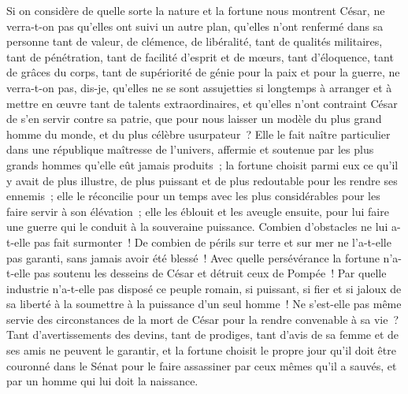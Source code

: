 \documentclass[french,twoside]{book} %
\begin{document}
Si on considère de quelle sorte la nature et la fortune nous montrent César, ne verra-t-on pas qu’elles ont suivi un autre plan, qu’elles n’ont renfermé dans sa personne tant de valeur, de clémence, de libéralité, tant de qualités militaires, tant de pénétration, tant de facilité d’esprit et de mœurs, tant d’éloquence, tant de grâces du corps, tant de supériorité de génie pour la paix et pour la guerre, ne verra-t-on pas, dis-je, qu’elles ne se sont assujetties si longtemps à arranger et à mettre en œuvre tant de talents extraordinaires, et qu’elles n’ont contraint César de s’en servir contre sa patrie, que pour nous laisser un modèle du plus grand homme du monde, et du plus célèbre usurpateur ? Elle le fait naître particulier dans une république maîtresse de l’univers, affermie et soutenue par les plus grands hommes qu’elle eût jamais produits ; la fortune choisit parmi eux ce qu’il y avait de plus illustre, de plus puissant et de plus redoutable pour les rendre ses ennemis ; elle le réconcilie pour un temps avec les plus considérables pour les faire servir à son élévation ; elle les éblouit et les aveugle ensuite, pour lui faire une guerre qui le conduit à la souveraine puissance. Combien d’obstacles ne lui a-t-elle pas fait surmonter ! De combien de périls sur terre et sur mer ne l’a-t-elle pas garanti, sans jamais avoir été blessé ! Avec quelle persévérance la fortune n’a-t-elle pas soutenu les desseins de César et détruit ceux de Pompée ! Par quelle industrie n’a-t-elle pas disposé ce peuple romain, si puissant, si fier et si jaloux de sa liberté à la soumettre à la puissance d’un seul homme ! Ne s’est-elle pas même servie des circonstances de la mort de César pour la rendre convenable à sa vie ? Tant d’avertissements des devins, tant de prodiges, tant d’avis de sa femme et de ses amis ne peuvent le garantir, et la fortune choisit le propre jour qu’il doit être couronné dans le Sénat pour le faire assassiner par ceux mêmes qu’il a sauvés, et par un homme qui lui doit la naissance.\par
\end{document}
